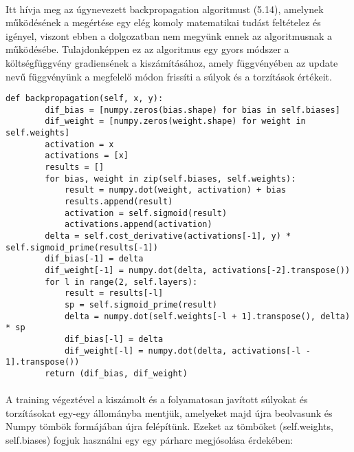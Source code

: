 \paragraph{}
Itt hívja meg az úgynevezett backpropagation algoritmust (5.14), amelynek működésének a megértése egy elég komoly matematikai tudást feltételez és igényel, viszont ebben a dolgozatban nem megyünk ennek az algoritmusnak a működésébe. Tulajdonképpen ez az algoritmus egy gyors módszer a költségfüggvény gradiensének a kiszámításához, amely függvényében az update nevű függvényünk a megfelelő módon frissíti a súlyok és a torzítások értékeit.

\begin{lstlisting}[caption=A backpropagation algoritmus]
    def backpropagation(self, x, y):
        dif_bias = [numpy.zeros(bias.shape) for bias in self.biases]
        dif_weight = [numpy.zeros(weight.shape) for weight in self.weights]
        activation = x
        activations = [x]
        results = []
        for bias, weight in zip(self.biases, self.weights):
            result = numpy.dot(weight, activation) + bias
            results.append(result)
            activation = self.sigmoid(result)
            activations.append(activation)
        delta = self.cost_derivative(activations[-1], y) * self.sigmoid_prime(results[-1])
        dif_bias[-1] = delta
        dif_weight[-1] = numpy.dot(delta, activations[-2].transpose())
        for l in range(2, self.layers):
            result = results[-l]
            sp = self.sigmoid_prime(result)
            delta = numpy.dot(self.weights[-l + 1].transpose(), delta) * sp
            dif_bias[-l] = delta
            dif_weight[-l] = numpy.dot(delta, activations[-l - 1].transpose())
        return (dif_bias, dif_weight)
\end{lstlisting}

\paragraph{}
A training végeztével a kiszámolt és a folyamatosan javított súlyokat és torzításokat egy-egy állományba mentjük, amelyeket majd újra beolvasunk és Numpy tömbök formájában újra felépítünk. Ezeket az tömböket (self.weights, self.biases) fogjuk használni egy egy párharc megjósolása érdekében:

